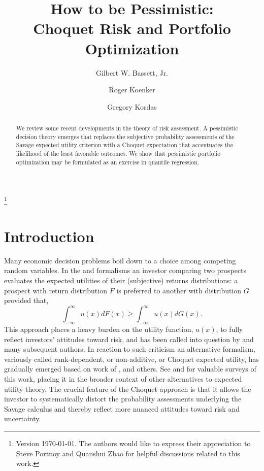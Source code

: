 \documentclass{birkart}
\theoremstyle{definition}
\theoremstyle{remark}
\numberwithin{equation}{section}
\begin{document}


\title[How to be Pessimistic]
 {How to be Pessimistic:\\ Choquet Risk and Portfolio Optimization}
\author[Bassett, Koenker, and Kordas]{Gilbert W. Bassett, Jr.}
\address{University of Illinois at Chicago}
\author{Roger Koenker} 
\address{University of Illinois at Urbana-Champaign}
\author{Gregory Kordas}
\address{University of Pennsylvania}



\thanks{Version \today. The authors would like to express their
appreciation to Steve Portnoy and Quanshui Zhao for  helpful
discussions related to this work.  }



\begin{abstract}
We review some recent developments in the theory of risk assessment.
A pessimistic decision theory emerges that replaces the subjective
probability assessments of the Savage expected utility criterion
with a Choquet expectation that accentuates the likelihood of the 
least favorable outcomes.  We show that pessimistic portfolio optimization 
may be formulated as an exercise in quantile regression.
\end{abstract}
\maketitle

\pagestyle{myheadings}
 

\setcounter{footnote}{0}
\renewcommand{\thefootnote}{\arabic{footnote}}


\section{Introduction}

Many economic decision problems boil down to a choice among competing
random variables.  In the  and  formalisms 
an investor comparing two prospects
evaluates the expected utilities of their (subjective) returns distributions:
a prospect with return distribution $F$ is preferred to another with
distribution $G$ provided that,
\[
\int_{- \infty}^\infty u(x) dF(x) \geq \int_{- \infty}^\infty u(x) dG(x) .
\]
This approach places a heavy burden on the utility function, $u(x)$,  to fully
reflect investors' attitudes toward risk, and has been called into
question by  and many subsequent authors.  In reaction to
such criticism an alternative formalism, variously called 
rank-dependent, or non-additive, or Choquet
expected utility, has gradually emerged based on work of ,
  and others.  
See  and  
for valuable surveys of this work, placing it in the broader context
of other alternatives to expected utility theory.
The crucial feature of the Choquet approach 
is that it allows the investor to systematically distort the probability 
assessments underlying the Savage calculus and thereby reflect 
more nuanced attitudes toward risk and uncertainty.
\end{document}
